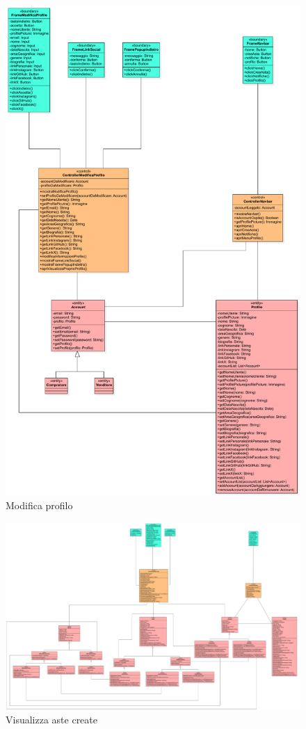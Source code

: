            \begin{figure}[htbp!]
                \centering
                    \includegraphics[width=0.8\linewidth]{Immagini/Diagrammi/Class Diagram/Utente che ha effettuato l'accesso/ModificaProfilo.pdf}
                \caption{Modifica profilo}
            \end{figure}
            
            \begin{figure}[htbp!]
                \centering
                    \includegraphics[width=1\linewidth]{Immagini/Diagrammi/Class Diagram/Utente che ha effettuato l'accesso/VisualizzaAsteCreate.pdf}
                \caption{Visualizza aste create}
            \end{figure}

